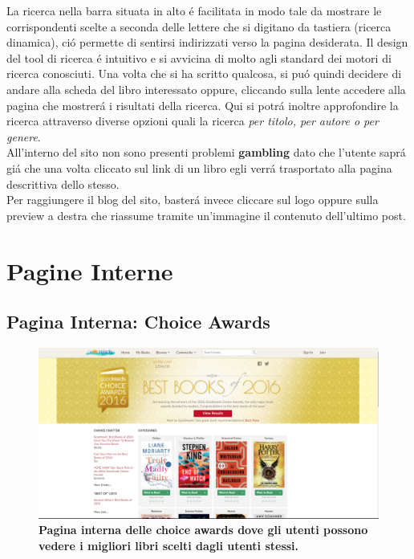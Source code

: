 \documentclass[12pt]{article}
\begin{document}
La ricerca nella barra situata in alto \'e facilitata in modo tale da mostrare le corrispondenti scelte a seconda delle lettere che si digitano da tastiera (ricerca dinamica), ci\'o permette di sentirsi indirizzati verso la pagina desiderata. Il design del tool di ricerca \'e intuitivo e si avvicina di molto agli standard dei motori di ricerca conosciuti. Una volta che si ha scritto qualcosa, si pu\'o quindi decidere di andare alla scheda del libro interessato oppure, cliccando sulla lente accedere alla pagina che mostrer\'a i risultati della ricerca. Qui si potr\'a inoltre approfondire la ricerca attraverso diverse opzioni quali la ricerca \textit{per titolo, per autore o per genere}. \\

All'interno del sito non sono presenti problemi \textbf{gambling} dato che l'utente sapr\'a gi\'a che una volta cliccato sul link di un libro egli verr\'a trasportato alla pagina descrittiva dello stesso.\\

Per raggiungere il blog del sito, baster\'a invece cliccare sul logo oppure sulla preview a destra che riassume tramite un'immagine il contenuto dell'ultimo post.


\section{Pagine Interne}

\subsection{Pagina Interna: Choice Awards}
\begin{figure}
	\centering 
	\includegraphics[width=16.5cm]{resources/choiceawards.png}
	\caption{\textbf{Pagina interna delle choice awards dove gli utenti possono vedere i migliori libri scelti dagli utenti stessi.}}
\end{figure}
\end{document}
